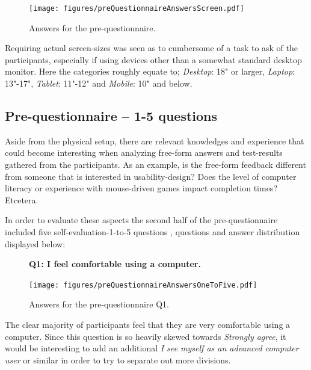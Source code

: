 \documentclass[nofilelist,dvipsnames]{cslthse-msc}
\begin{document}
				\begin{figure}[h!]
					\centering
					\texttt{[image: figures/preQuestionnaireAnswersScreen.pdf]}
					\caption{Answers for the pre-questionnaire.}
				\end{figure}

        Requiring actual screen-sizes was seen as to cumbersome of a task to
        ask of the participants, especially if using devices other than a
        somewhat standard desktop monitor. Here the categories roughly equate
        to; \textit{Desktop}: 18" or larger, \textit{Laptop}: 13"-17", \textit{Tablet}:
        11"-12" and \textit{Mobile}: 10" and below.

			\subsection{Pre-questionnaire -- 1-5 questions}

        Aside from the physical setup, there are relevant knowledges and
        experience that could become interesting when analyzing free-form
        answers and test-results gathered from the participants. As an example,
        is the free-form feedback different from someone that is interested in
        usability-design? Does the level of computer literacy or experience
        with mouse-driven games impact completion times? Etcetera.

        In order to evaluate these aspects the second half of the
        pre-questionnaire included five self-evaluation-1-to-5 questions
        , questions and answer distribution
        displayed below:

				\begin{figure}[h!]
          \textbf{Q1: I feel comfortable using a computer.}
          \begin{center}
            \texttt{[image: figures/preQuestionnaireAnswersOneToFive.pdf]}
            \vspace{-1cm}
            \caption{Answers for the pre-questionnaire Q1.}
          \end{center}
				\end{figure}

        The clear majority of participants feel that they are very comfortable
        using a computer. Since this question is so heavily skewed towards
        \textit{Strongly agree}, it would be interesting to add an additional
        \textit{I see myself as an advanced computer user} or similar in order
        to try to separate out more divisions.
\end{document}
